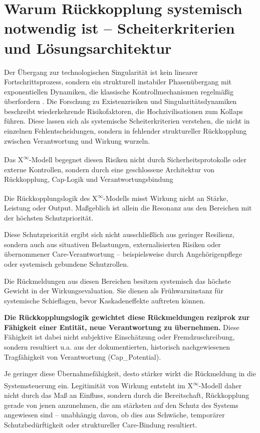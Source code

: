 \documentclass[12pt,a4paper]{article}
\begin{document}
\section{Warum Rückkopplung systemisch notwendig ist – Scheiterkriterien und Lösungsarchitektur}

Der Übergang zur technologischen Singularität ist kein linearer Fortschrittsprozess, sondern ein strukturell instabiler Phasenübergang mit exponentiellen Dynamiken, die klassische Kontrollmechanismen regelmäßig überfordern \cite{bostrom2014,yudkowsky2008,russell2019,amodei2016}. Die Forschung zu Existenzrisiken und Singularitätsdynamiken beschreibt wiederkehrende Risikofaktoren, die Hochzivilisationen zum Kollaps führen. Diese lassen sich als systemische Scheiterkriterien verstehen, die nicht in einzelnen Fehlentscheidungen, sondern in fehlender struktureller Rückkopplung zwischen Verantwortung und Wirkung wurzeln.

Das \texorpdfstring{X\textsuperscript{\(\infty\)}}{X-Infinity}-Modell begegnet diesen Risiken nicht durch Sicherheitsprotokolle oder externe Kontrollen, sondern durch eine geschlossene Architektur von Rückkopplung, Cap-Logik und Verantwortungsbindung

Die Rückkopplungslogik des \texorpdfstring{X\textsuperscript{\(\infty\)}}{X-Infinity}-Modells misst Wirkung nicht an Stärke, Leistung oder Output.  
Maßgeblich ist allein die Resonanz aus den Bereichen mit der höchsten Schutzpriorität.

Diese Schutzpriorität ergibt sich nicht ausschließlich aus geringer Resilienz, sondern auch aus situativen Belastungen, externalisierten Risiken oder übernommener Care-Verantwortung – beispielsweise durch Angehörigenpflege oder systemisch gebundene Schutzrollen.

Die Rückmeldungen aus diesen Bereichen besitzen systemisch das höchste Gewicht in der Wirkungsevaluation.  
Sie dienen als Frühwarninstanz für systemische Schieflagen, bevor Kaskadeneffekte auftreten können.

\textbf{Die Rückkopplungslogik gewichtet diese Rückmeldungen reziprok zur Fähigkeit einer Entität, neue Verantwortung zu übernehmen.}  
Diese Fähigkeit ist dabei nicht subjektive Einschätzung oder Fremdzuschreibung, sondern resultiert u.a. aus der dokumentierten, historisch nachgewiesenen Tragfähigkeit von Verantwortung (Cap\_Potential).

Je geringer diese Übernahmefähigkeit, desto stärker wirkt die Rückmeldung in die Systemsteuerung ein.  
Legitimität von Wirkung entsteht im \texorpdfstring{X\textsuperscript{\(\infty\)}}{X-Infinity}-Modell daher nicht durch das Maß an Einfluss, sondern durch die Bereitschaft, Rückkopplung gerade von jenen anzunehmen, die am stärksten auf den Schutz des Systems angewiesen sind – unabhängig davon, ob dies aus Schwäche, temporärer Schutzbedürftigkeit oder struktureller Care-Bindung resultiert.
\end{document}
